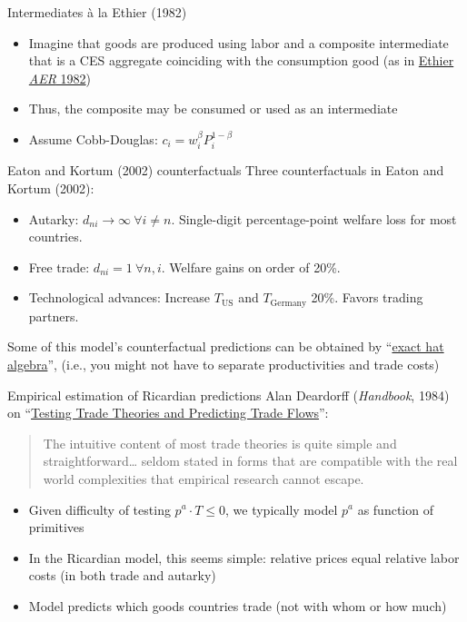 \documentclass[11pt,notes=hide,aspectratio=169]{beamer}
\begin{document}
\begin{frame}{Intermediates \`{a} la Ethier (1982)}
\begin{itemize}
	\item Imagine that goods are produced using labor and a composite intermediate that is a CES aggregate coinciding with the consumption good (as in \href{https://www.jstor.org/stable/1831539}{Ethier \textit{AER} 1982})
	\item Thus, the composite may be consumed or used as an intermediate
	\item Assume Cobb-Douglas: $c_i = w_i^\beta P_i^{1-\beta}$
\end{itemize}
\end{frame}
\begin{frame}{Eaton and Kortum (2002) counterfactuals}
Three counterfactuals in Eaton and Kortum (2002):
\begin{itemize}
	\item Autarky: $d_{ni} \to \infty \ \forall i\neq n$. Single-digit percentage-point welfare loss for most countries.
	\item Free trade: $d_{ni}=1 \ \forall n,i$. Welfare gains on order of 20\%.
	\item Technological advances: Increase $T_{\text{US}}$ and  $T_{\text{Germany}}$ 20\%. Favors trading partners.
\end{itemize}
Some of this model's counterfactual predictions can be obtained by ``\href{https://tradediversion.net/2018/05/07/on-hat-algebra/}{exact hat algebra}'', (i.e., you might not have to separate productivities and trade costs)
\end{frame}
\begin{frame}{Empirical estimation of Ricardian predictions}
Alan Deardorff (\textit{Handbook}, 1984) on ``\href{https://doi.org/10.1016/S1573-4404(84)01013-3}{Testing Trade Theories and Predicting Trade Flows}'':
\begin{quote}
The intuitive content of most trade theories is quite simple and straightforward\dots 
seldom stated in forms that are compatible with the real world complexities that empirical research cannot escape.
\end{quote}
\begin{itemize}
	\item Given difficulty of testing $p^a \cdot T \leq 0$,
	we typically model $p^a$ as function of primitives
	\item In the Ricardian model, this seems simple: 
	relative prices equal relative labor costs (in both trade and autarky)
	\item Model predicts which goods countries trade (not with whom or how much)
\end{itemize}
\end{frame}
\end{document}
